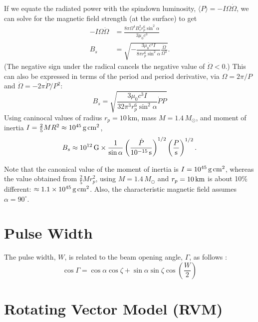 \documentclass{book}
\begin{document}
If we equate the radiated power with the spindown luminosity, $\langle P \rangle = -I\Omega\dot{\Omega}$, we can solve for the magnetic field strength (at the surface) to get
\begin{equation}
  \begin{aligned}
    -I\Omega\dot{\Omega}
      &= \frac{8\pi \Omega^4 B_s^2 r_p^6 \sin^2\alpha}{3\mu_0 c^3} \\
    B_s &= \sqrt{-\frac{3\mu_0 c^3 I}{8\pi r_p^6 \sin^2\alpha} \frac{\dot{\Omega}}{\Omega^3}}.
  \end{aligned}
\end{equation}
(The negative sign under the radical cancels the negative value of $\dot{\Omega} < 0$.)
This can also be expressed in terms of the period and period derivative, via $\Omega = 2\pi/P$ and $\dot{\Omega} = -2\pi \dot{P}/P^2$:
\begin{equation}
  B_s = \sqrt{\frac{3\mu_0 c^3 I}{32\pi^3 r_p^6 \sin^2\alpha} \dot{P}P}
\end{equation}
Using caninocal values of radius $r_p = 10\,$km, mass $M = 1.4\,M_\odot$, and moment of inertia $I = \frac25 MR^2 \approx 10^{45}\,{\rm g}\,{\rm cm}^2$,
\begin{equation}
  B_s \approx 10^{12}\,{\rm G} \times \frac{1}{\sin\alpha}
      \left(\frac{\dot{P}}{10^{-15}\,{\rm s}}\right)^{1/2}
      \left(\frac{P}{\rm s}\right)^{1/2}.
\end{equation}

Note that the canonical value of the moment of inertia is $I = 10^{45}\,{\rm g}\,{\rm cm}^2$, whereas the value obtained from $\frac25 M r_p^2$, using $M = 1.4\,M_\odot$ and $r_p = 10\,{\rm km}$ is about 10\% different: $\approx 1.1 \times 10^{45}\,{\rm g}\,{\rm cm}^2$.
Also, the characteristic magnetic field assumes $\alpha = 90^\circ$.

\section{Pulse Width}

The pulse width, $W$, is related to the beam opening angle, $\Gamma$, as follows \citep{Lorimer2005}:
\begin{equation}
    \cos\Gamma = \cos\alpha\cos\zeta + \sin\alpha\sin\zeta\cos\left(\frac{W}{2}\right)
    \tag{H3.27}
\end{equation}

\section{Rotating Vector Model (RVM)}
\end{document}
